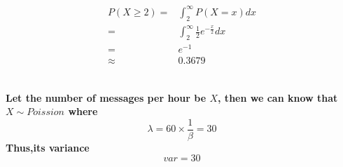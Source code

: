 \documentclass{article}
\begin{document}
        \subsection{}
            \paragraph{
                \begin{equation*}
                    \begin{split}
                        P(X\geq 2 )=&\int_{2}^\infty P(X=x)dx\\
                            =&\int_{2}^\infty \frac{1}{2}e^{-\frac{x}{2}}dx\\
                            =&e^{-1}\\
                            \approx&0.3679\\
                    \end{split}
                \end{equation*}
            }
        \subsection{}
            \paragraph{
                Let the number of messages per hour be $X$, then we can know that $X\sim Poission$ where $$\lambda=60\times \frac{1}{\beta}=30$$
                Thus,its variance $$var=30$$
            }
\end{document}
